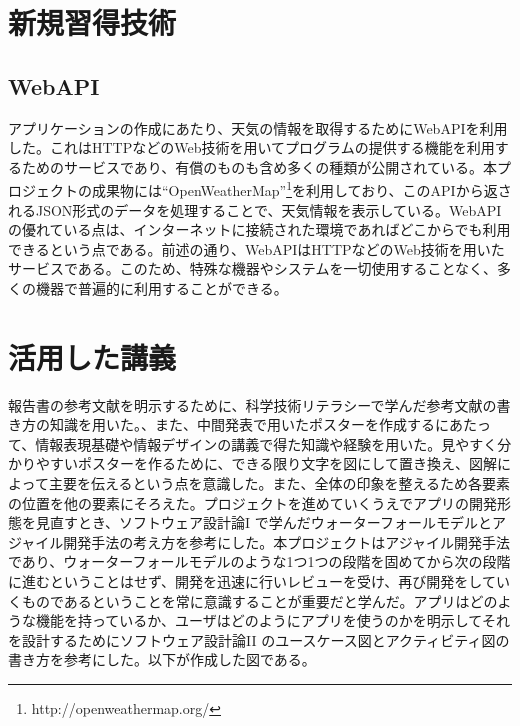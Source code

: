 \documentclass[openany,11pt,papersize]{jsbook}
\begin{document}
\begin{appendix}
\chapter{新規習得技術}
\section{WebAPI}
アプリケーションの作成にあたり、天気の情報を取得するためにWebAPIを利用した。これはHTTPなどのWeb技術を用いてプログラムの提供する機能を利用するためのサービスであり、有償のものも含め多くの種類が公開されている。本プロジェクトの成果物には``OpenWeatherMap''\footnote{http://openweathermap.org/}を利用しており、このAPIから返されるJSON形式のデータを処理することで、天気情報を表示している。WebAPIの優れている点は、インターネットに接続された環境であればどこからでも利用できるという点である。前述の通り、WebAPIはHTTPなどのWeb技術を用いたサービスである。このため、特殊な機器やシステムを一切使用することなく、多くの機器で普遍的に利用することができる。

\chapter{活用した講義}
 報告書の参考文献を明示するために、科学技術リテラシーで学んだ参考文献の書き方の知識を用いた。、また、中間発表で用いたポスターを作成するにあたって、情報表現基礎や情報デザインの講義で得た知識や経験を用いた。見やすく分かりやすいポスターを作るために、できる限り文字を図にして置き換え、図解によって主要を伝えるという点を意識した。また、全体の印象を整えるため各要素の位置を他の要素にそろえた。プロジェクトを進めていくうえでアプリの開発形態を見直すとき、ソフトウェア設計論I  で学んだウォーターフォールモデルとアジャイル開発手法の考え方を参考にした。本プロジェクトはアジャイル開発手法であり、ウォーターフォールモデルのような1つ1つの段階を固めてから次の段階に進むということはせず、開発を迅速に行いレビューを受け、再び開発をしていくものであるということを常に意識することが重要だと学んだ。アプリはどのような機能を持っているか、ユーザはどのようにアプリを使うのかを明示してそれを設計するためにソフトウェア設計論II  のユースケース図とアクティビティ図の書き方を参考にした。以下が作成した図である。



\end{appendix}
\end{document}
